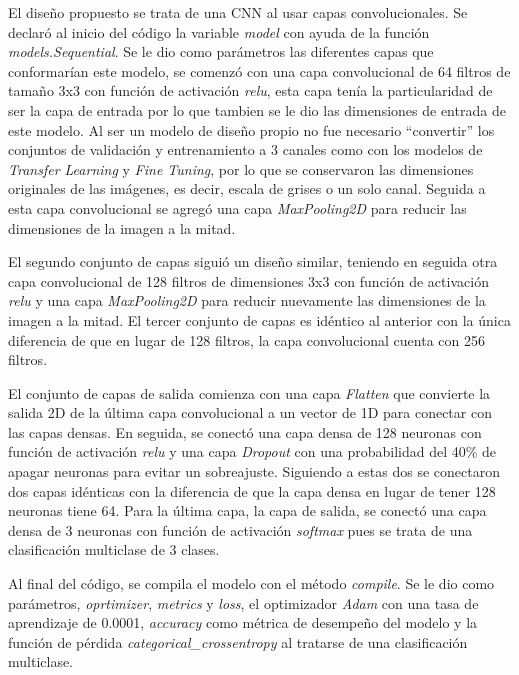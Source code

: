 El diseño propuesto se trata de una CNN al usar capas convolucionales. Se declaró al inicio del código la variable \textit{model} con ayuda de la función \textit{models.Sequential}. Se le dio como parámetros las diferentes capas que conformarían este modelo, se comenzó con una capa convolucional de 64 filtros de tamaño 3x3 con función de activación \textit{relu}, esta capa tenía la particularidad de ser la capa de entrada por lo que tambien se le dio las dimensiones de entrada de este modelo. Al ser un modelo de diseño propio no fue necesario ``convertir'' los conjuntos de validación y entrenamiento a 3 canales como con los modelos de \textit{Transfer Learning} y \textit{Fine Tuning}, por lo que se conservaron las dimensiones originales de las imágenes, es decir, escala de grises o un solo canal. Seguida a esta capa convolucional se agregó una capa \textit{MaxPooling2D} para reducir las dimensiones de la imagen a la mitad.

El segundo conjunto de capas siguió un diseño similar, teniendo en seguida otra capa convolucional de 128 filtros de dimensiones 3x3 con función de activación \textit{relu} y una capa \textit{MaxPooling2D} para reducir nuevamente las dimensiones de la imagen a la mitad. El tercer conjunto de capas es idéntico al anterior con la única diferencia de que en lugar de 128 filtros, la capa convolucional cuenta con 256 filtros.

El conjunto de capas de salida comienza con una capa \textit{Flatten} que convierte la salida 2D de la última capa convolucional a un vector de 1D para conectar con las capas densas. En seguida, se conectó una capa densa de 128 neuronas con función de activación \textit{relu} y una capa \textit{Dropout} con una probabilidad del 40\% de apagar neuronas para evitar un sobreajuste. Siguiendo a estas dos se conectaron dos capas idénticas con la diferencia de que la capa densa en lugar de tener 128 neuronas tiene 64. Para la última capa, la capa de salida, se conectó una capa densa de 3 neuronas con función de activación \textit{softmax} pues se trata de una clasificación multiclase de 3 clases.

Al final del código, se compila el modelo con el método \textit{compile}. Se le dio como parámetros, \textit{oprtimizer}, \textit{metrics} y \textit{loss}, el optimizador \textit{Adam} con una tasa de aprendizaje de 0.0001, \textit{accuracy} como métrica de desempeño del modelo y la función de pérdida \textit{categorical\_crossentropy} al tratarse de una clasificación multiclase.

